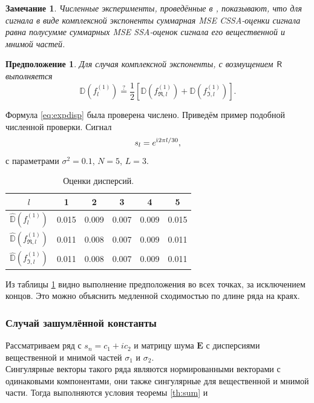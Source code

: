 \documentclass[12pt,a4paper]{article}
\newtheorem{remark}{Замечание}%
\newtheorem*{prop*}{Предположение}
\begin{document}
\begin{remark}
Численные эксперименты, проведённые в \cite{Golyandina.etal2013}, показывают, что для сигнала в виде комплексной экспоненты суммарная MSE CSSA-оценки сигнала равна полусумме суммарных MSE SSA-оценок сигнала его вещественной и мнимой частей.
\end{remark}

\begin{prop*}
	Для случая комплексной экспоненты, с возмущением $\textsf{R}$ выполняется
	\begin{equation} \label{eq:expdisp}
		\mathbb{D}(f^{(1)}_l) \stackrel{?}{=} \frac{1}{2}[\mathbb{D}(f^{(1)}_{\Re, l}) + \mathbb{D}(f^{(1)}_{\Im, l})].
	\end{equation}
\end{prop*}

Формула \eqref{eq:expdisp} была проверена числено. Приведём пример подобной численной проверки.
Сигнал $$s_l = e^{\mathrm{i}\mkern1mu 2 \pi l / 30},$$
с параметрами $\sigma^2 = 0.1$, $N = 5$, $L = 3$.

\begin{table}[H]
	\begin{center}
		\caption{Оценки дисперсий.}
		\label{tab:pi_div_2}
		\begin{tabular}{|c|c|c|c|c|c|}
			\hline
			$l$	& 1 & 2 & 3 & 4 & 5\\
			\hline
			$\hat{\mathbb{D}}(f^{(1)}_l)$ & 0.015  & 0.009  & 0.007 & 0.009 & 0.015\\
			\hline
			$\hat{\mathbb{D}}(f^{(1)}_{\Re, l})$ & 0.011 & 0.008 & 0.007 & 0.009 & 0.011\\
			\hline
			$\hat{\mathbb{D}}(f^{(1)}_{\Im, l})$ & 0.011  & 0.008  & 0.007 & 0.009 & 0.011\\
			\hline
		\end{tabular}
	\end{center}
\end{table}

Из таблицы \ref{tab:pi_div_2} видно выполнение предположения во всех точках, за исключением концов. Это можно объяснить медленной сходимостью по длине ряда на краях.

\subsubsection{Случай зашумлённой константы}

Рассматриваем ряд с $s_n = c_1 + ic_2$ и матрицу шума $\mathbf{E}$ с дисперсиями вещественной и мнимой частей $\sigma_1$ и $\sigma_2$.\\
Сингулярные векторы такого ряда являются нормированными векторами с одинаковыми компонентами, они также сингулярные для вещественной и мнимой части. Тогда выполняются условия теоремы \ref{th:sum} и
\end{document}
